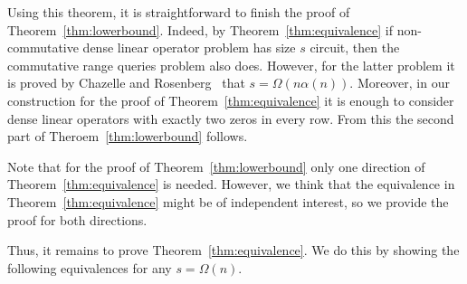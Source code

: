 \documentclass[11pt,letterpaper]{article}
\begin{document}
Using this theorem, it is straightforward to finish the proof of
Theorem~\ref{thm:lowerbound}.
Indeed, by Theorem~\ref{thm:equivalence} if non-commutative dense linear operator problem has size $s$ circuit, then the commutative range queries problem also does. However, for the latter problem it is proved by Chazelle and Rosenberg~\cite{DBLP:journals/ijcga/ChazelleR91} that $s=\Omega(n \alpha(n))$. Moreover, in our construction for the proof of Theorem~\ref{thm:equivalence} it is enough to consider dense linear operators with exactly two zeros in every row. From this the second part of Theroem~\ref{thm:lowerbound} follows.

Note that for the proof of Theorem~\ref{thm:lowerbound} only one direction of Theorem~\ref{thm:equivalence} is needed. However, we think that the equivalence in Theorem~\ref{thm:equivalence} might be of independent interest, so we provide the proof for both directions.

Thus, it remains to prove Theorem~\ref{thm:equivalence}. We do this by showing the following equivalences for any $s = \Omega(n)$.

\begin{center}
\end{center}

\end{document}
